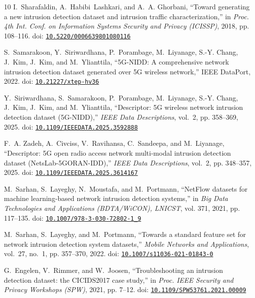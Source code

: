 \begin{thebibliography}{10}
I.~Sharafaldin, A.~Habibi~Lashkari, and A.~A. Ghorbani, ``Toward generating a
  new intrusion detection dataset and intrusion traffic characterization,'' in
  \emph{Proc. 4th Int. Conf. on Information Systems Security and Privacy
  (ICISSP)}, 2018, pp. 108--116. doi:
  \href{https://doi.org/10.5220/0006639801080116}{\nolinkurl{10.5220/0006639801080116}}

S.~Samarakoon, Y.~Siriwardhana, P.~Porambage, M.~Liyanage, S.-Y. Chang, J.~Kim,
  J.~Kim, and M.~Ylianttila, ``{5G-NIDD}: A comprehensive network intrusion
  detection dataset generated over {5G} wireless network,'' IEEE DataPort,
  2022. doi:
  \href{https://doi.org/10.21227/xtep-hv36}{\nolinkurl{10.21227/xtep-hv36}}

Y.~Siriwardhana, S.~Samarakoon, P.~Porambage, M.~Liyanage, S.-Y. Chang, J.~Kim,
  J.~Kim, and M.~Ylianttila, ``Descriptor: {5G} wireless network intrusion
  detection dataset ({5G-NIDD}),'' \emph{IEEE Data Descriptions}, vol.~2, pp.
  358--369, 2025. doi:
  \href{https://doi.org/10.1109/IEEEDATA.2025.3592888}{\nolinkurl{10.1109/IEEEDATA.2025.3592888}}

F.~A. Zadeh, A.~Civciss, V.~Ravihansa, C.~Sandeepa, and M.~Liyanage,
  ``Descriptor: {5G} open radio access network multi-modal intrusion detection
  dataset ({NetsLab-5GORAN-IDD}),'' \emph{IEEE Data Descriptions}, vol.~2, pp.
  348--357, 2025. doi:
  \href{https://doi.org/10.1109/IEEEDATA.2025.3614167}{\nolinkurl{10.1109/IEEEDATA.2025.3614167}}

M.~Sarhan, S.~Layeghy, N.~Moustafa, and M.~Portmann, ``{NetFlow} datasets for
  machine learning-based network intrusion detection systems,'' in \emph{Big
  Data Technologies and Applications (BDTA/WiCON), LNICST}, vol. 371, 2021, pp.
  117--135. doi:
  \href{https://doi.org/10.1007/978-3-030-72802-1_9}{\nolinkurl{10.1007/978-3-030-72802-1_9}}

M.~Sarhan, S.~Layeghy, and M.~Portmann, ``Towards a standard feature set for
  network intrusion detection system datasets,'' \emph{Mobile Networks and
  Applications}, vol.~27, no.~1, pp. 357--370, 2022. doi:
  \href{https://doi.org/10.1007/s11036-021-01843-0}{\nolinkurl{10.1007/s11036-021-01843-0}}

G.~Engelen, V.~Rimmer, and W.~Joosen, ``Troubleshooting an intrusion detection
  dataset: the {CICIDS2017} case study,'' in \emph{Proc. IEEE Security and
  Privacy Workshops (SPW)}, 2021, pp. 7--12. doi:
  \href{https://doi.org/10.1109/SPW53761.2021.00009}{\nolinkurl{10.1109/SPW53761.2021.00009}}


\end{thebibliography}
